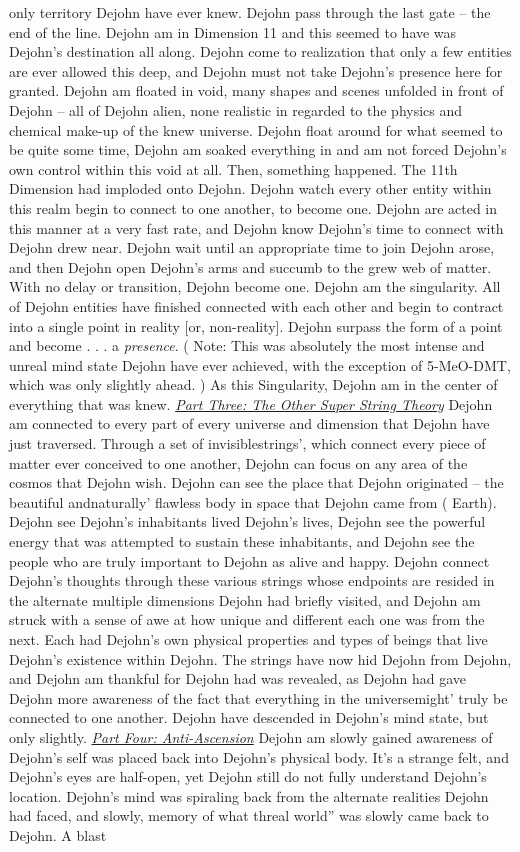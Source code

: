 \documentclass[12pt]{book}
\begin{document}
only territory Dejohn have ever knew. Dejohn pass through the last gate -- the end of the line. Dejohn am in Dimension 11 and this seemed to have was Dejohn's destination all along. Dejohn come to realization that only a few entities are ever allowed this deep, and Dejohn must not take Dejohn's presence here for granted. Dejohn am floated in void, many shapes and scenes unfolded in front of Dejohn -- all of Dejohn alien, none realistic in regarded to the physics and chemical make-up of the knew universe. Dejohn float around for what seemed to be quite some time, Dejohn am soaked everything in and am not forced Dejohn's own control within this void at all. Then, something happened. The 11th Dimension had imploded onto Dejohn. Dejohn watch every other entity within this realm begin to connect to one another, to become one. Dejohn are acted in this manner at a very fast rate, and Dejohn know Dejohn's time to connect with Dejohn drew near. Dejohn wait until an appropriate time to join Dejohn arose, and then Dejohn open Dejohn's arms and succumb to the grew web of matter. With no delay or transition, Dejohn become one. Dejohn am the singularity. All of Dejohn entities have finished connected with each other and begin to contract into a single point in reality [or, non-reality]. Dejohn surpass the form of a point and become . . .  a \emph{presence}. ( Note: This was absolutely the most intense and unreal mind state Dejohn have ever achieved, with the exception of 5-MeO-DMT, which was only slightly ahead. ) As this Singularity, Dejohn am in the center of everything that was knew. \underline{\emph{Part Three: The Other Super String Theory}} Dejohn am connected to every part of every universe and dimension that Dejohn have just traversed. Through a set of invisiblestrings', which connect every piece of matter ever conceived to one another, Dejohn can focus on any area of the cosmos that Dejohn wish. Dejohn can see the place that Dejohn originated -- the beautiful andnaturally' flawless body in space that Dejohn came from ( Earth). Dejohn see Dejohn's inhabitants lived Dejohn's lives, Dejohn see the powerful energy that was attempted to sustain these inhabitants, and Dejohn see the people who are truly important to Dejohn as alive and happy. Dejohn connect Dejohn's thoughts through these various strings whose endpoints are resided in the alternate multiple dimensions Dejohn had briefly visited, and Dejohn am struck with a sense of awe at how unique and different each one was from the next. Each had Dejohn's own physical properties and types of beings that live Dejohn's existence within Dejohn. The strings have now hid Dejohn from Dejohn, and Dejohn am thankful for Dejohn had was revealed, as Dejohn had gave Dejohn more awareness of the fact that everything in the universemight' truly be connected to one another. Dejohn have descended in Dejohn's mind state, but only slightly. \underline{\emph{Part Four: Anti-Ascension}} Dejohn am slowly gained awareness of Dejohn's self was placed back into Dejohn's physical body. It's a strange felt, and Dejohn's eyes are half-open, yet Dejohn still do not fully understand Dejohn's location. Dejohn's mind was spiraling back from the alternate realities Dejohn had faced, and slowly, memory of what threal world'' was slowly came back to Dejohn. A blast 
\end{document}
